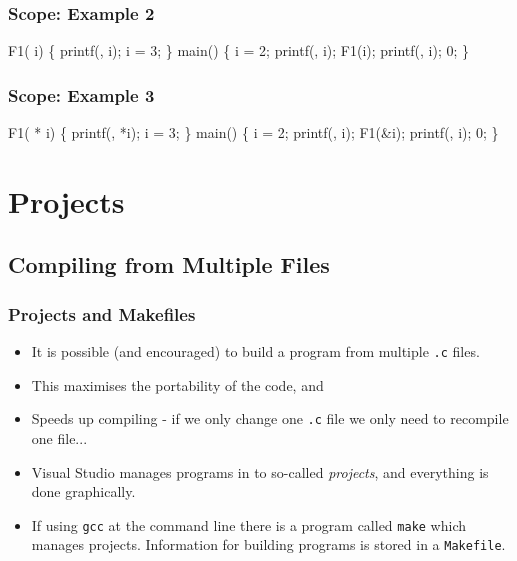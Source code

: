 \documentclass[smaller,table]{beamer}
\begin{document}
\begin{frame}[fragile]
\frametitle{Scope: Example 2}
\vspace{-0.1in}
\begin{semiverbatim}
\kr\kl{} 
\kl
\kl{} F1( i)
\kl\{
\kl   printf(, i);
\kl   i = 3;  
\kl\}
\kl
\kl{} main()
\kl\{
\kl   {} i = 2;
\kl   printf(, i);
\kl   F1(i);
\kl   printf(, i);
\kl   {} 0;
\kl\}
\end{semiverbatim}
\end{frame}

\begin{frame}[fragile]
\frametitle{Scope: Example 3}
\vspace{-0.1in}
\begin{semiverbatim}
\kr\kl{} 
\kl
\kl{} F1( * i)
\kl\{
\kl   printf(, *i);
\kl   *i = 3;  
\kl\}
\kl
\kl{} main()
\kl\{
\kl   {} i = 2;
\kl   printf(, i);
\kl   F1(\&i);
\kl   printf(, i);
\kl   {} 0;
\kl\}
\end{semiverbatim}
\end{frame}

\section{Projects}
\subsection{Compiling from Multiple Files}
\begin{frame}
\frametitle{Projects and Makefiles}
\begin{itemize}
\item It is possible (and encouraged) to build a program from multiple {\tt .c} files.
\item This maximises the portability of the code, and
\item Speeds up compiling - if we only change one {\tt .c} file we only need to recompile one file...
\item Visual Studio manages programs in to so-called \emph{projects}, and everything is done graphically.
\item If using \texttt{gcc} at the command line there is a program called {\tt make} which manages projects. Information for building programs is stored in a \texttt{Makefile}.
\end{itemize}
\end{frame}
\end{document}
